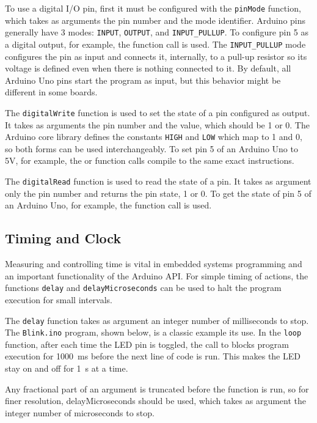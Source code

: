 To use a digital I/O pin, first it must be configured with the \texttt{pinMode} function, which takes as arguments the pin number and the mode identifier.
Arduino pins generally have 3 modes: \texttt{INPUT}, \texttt{OUTPUT}, and \texttt{INPUT\_PULLUP}.
To configure pin 5 as a digital output, for example, the   function call is used.
The \texttt{INPUT\_PULLUP} mode configures the pin as input and connects it, internally, to a pull-up resistor so its voltage is defined even when there is nothing connected to it.
By default, all Arduino Uno pins start the program as input, but this behavior might be different in some boards.

The \texttt{digitalWrite} function is used to set the state of a pin configured as output.
It takes as arguments the pin number and the value, which should be 1 or 0.
The Arduino core library defines the constants \texttt{HIGH} and \texttt{LOW} which map to 1 and 0, so both forms can be used interchangeably.
To set pin 5 of an Arduino Uno to 5V, for example, the  or  function calls compile to the same exact instructions.

The \texttt{digitalRead} function is used to read the state of a pin.
It takes as argument only the pin number and returns the pin state, 1 or 0.
To get the state of pin 5 of an Arduino Uno, for example, the   function call is used.

\subsection{Timing and Clock}
Measuring and controlling time is vital in embedded systems programming and an important functionality of the Arduino API.
For simple timing of actions, the functions \texttt{delay} and \texttt{delayMicroseconds} can be used to halt the program execution for small intervals.

The \texttt{delay} function takes as argument an integer number of milliseconds to stop.
The \texttt{Blink.ino} program, shown below, is a classic example its use.
In the \texttt{loop} function, after each time the LED pin is toggled, the call to  blocks program execution for \SI{1000}{ms} before the next line of code is run.
This makes the LED stay on and off for \SI{1}{s} at a time.


Any fractional part of an argument is truncated before the function is run, so for finer resolution, {delayMicroseconds} should be used, which takes as argument the integer number of microseconds to stop.

